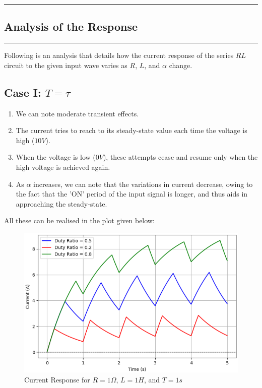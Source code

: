 \newpage
{\color{gray}\hrule}
\begin{center}
\section{Analysis of the Response}
\bigskip
\end{center}
{\color{gray}\hrule}
\begin{multicols}{2}

Following is an analysis that details how the current response of the series $RL$ circuit to the given input wave varies as $R$, $L$, and $\alpha$ change.

\subsection{Case I: $T=\tau$}
\begin{enumerate}
    \item We can note moderate transient effects.
    \item The current tries to reach to its steady-state value each time the voltage is high ($10V$).
    \item When the voltage is low ($0V$), these attempts cease and resume only when the high voltage is achieved again.
    \item As $\alpha$ increases, we can note that the variations in current decrease, owing to the fact that the 'ON' period of the input signal is longer, and thus aids in approaching the steady-state.
\end{enumerate}
All these can be realised in the plot given below: \\
\begin{figure}[H]
  \centering
  \includegraphics[width=\columnwidth]{sections/6_case1.png}
  \caption{Current Response for $R=1\Omega$, $L=1H$, and $T=1s$}
\end{figure}


\end{multicols}
